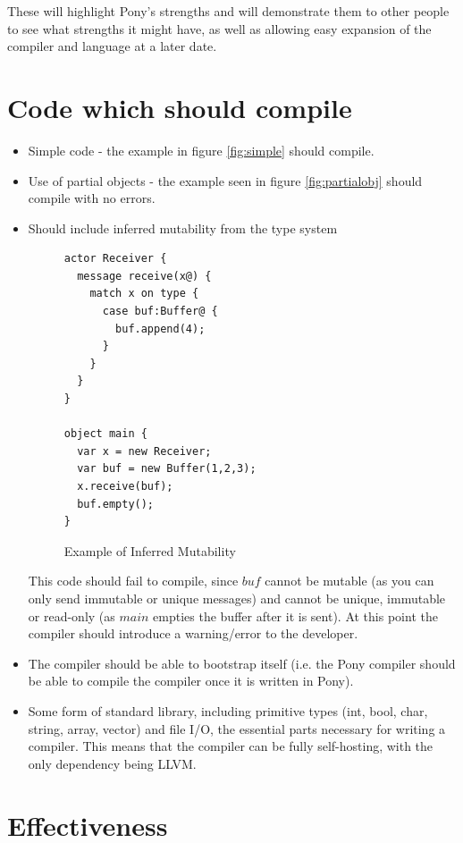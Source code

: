 \documentclass[11pt,a4paper]{report}
\begin{document}
These will highlight Pony's strengths and will demonstrate them to other people to see what strengths it might have, as well as allowing easy expansion of the compiler and language at a later date.

\section{Code which should compile}

\begin{itemize}

\item Simple code - the example in figure \ref{fig:simple} should compile.
\item Use of partial objects - the example seen in figure \ref{fig:partialobj} should compile with no errors.

\item Should include inferred mutability from the type system

\begin{figure}[H]
\begin{verbatim}
actor Receiver {
  message receive(x@) {
    match x on type {
      case buf:Buffer@ {
        buf.append(4);
      }
    }
  }
}

object main {
  var x = new Receiver;
  var buf = new Buffer(1,2,3);
  x.receive(buf);
  buf.empty();
}
\end{verbatim}
\caption{Example of Inferred Mutability}
\end{figure}

This code should fail to compile, since $buf$ cannot be mutable (as you can only send immutable or unique messages) and cannot be unique, immutable or read-only (as $main$ empties the buffer after it is sent).
At this point the compiler should introduce a warning/error to the developer.

\item The compiler should be able to bootstrap itself (i.e. the Pony compiler should be able to compile the compiler once it is written in Pony).

\item Some form of standard library, including primitive types (int, bool, char, string, array, vector) and file I/O, the essential parts necessary for writing a compiler.
	This means that the compiler can be fully self-hosting, with the only dependency being LLVM.
\end{itemize}

\section{Effectiveness}
\end{document}
